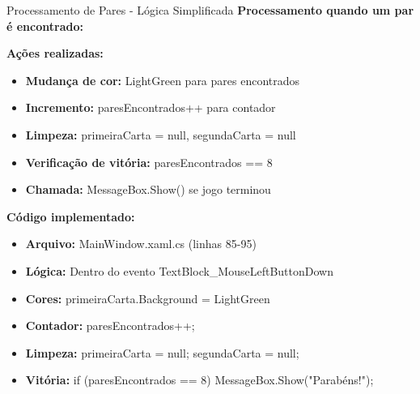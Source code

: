 \documentclass[aspectratio=169]{beamer}
\begin{document}
\begin{frame}{Processamento de Pares - Lógica Simplificada}
\textbf{Processamento quando um par é encontrado:}

\textbf{Ações realizadas:}
\begin{itemize}
    \item \textbf{Mudança de cor:} LightGreen para pares encontrados
    \item \textbf{Incremento:} paresEncontrados++ para contador
    \item \textbf{Limpeza:} primeiraCarta = null, segundaCarta = null
    \item \textbf{Verificação de vitória:} paresEncontrados == 8
    \item \textbf{Chamada:} MessageBox.Show() se jogo terminou
\end{itemize}

\textbf{Código implementado:}
\begin{itemize}
    \item \textbf{Arquivo:} MainWindow.xaml.cs (linhas 85-95)
    \item \textbf{Lógica:} Dentro do evento TextBlock\_MouseLeftButtonDown
    \item \textbf{Cores:} primeiraCarta.Background = LightGreen
    \item \textbf{Contador:} paresEncontrados++;
    \item \textbf{Limpeza:} primeiraCarta = null; segundaCarta = null;
    \item \textbf{Vitória:} if (paresEncontrados == 8) MessageBox.Show("Parabéns!");
\end{itemize}
\end{frame}
\end{document}

